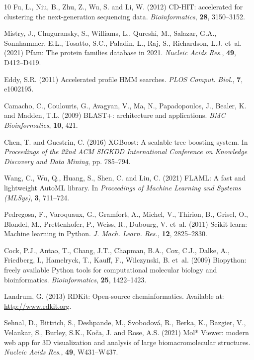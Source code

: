 \documentclass[unnumsec,webpdf,contemporary,large]{oup-authoring-template}%
\begin{document}
\begin{thebibliography}{10}
Fu, L., Niu, B., Zhu, Z., Wu, S. and Li, W. (2012)
CD-HIT: accelerated for clustering the next-generation sequencing data.
\newblock \emph{Bioinformatics}, \textbf{28}, 3150--3152.

Mistry, J., Chuguransky, S., Williams, L., Qureshi, M., Salazar, G.A., Sonnhammer, E.L., Tosatto, S.C., Paladin, L., Raj, S., Richardson, L.J. et~al. (2021)
Pfam: The protein families database in 2021.
\newblock \emph{Nucleic Acids Res.}, \textbf{49}, D412--D419.

Eddy, S.R. (2011)
Accelerated profile HMM searches.
\newblock \emph{PLOS Comput. Biol.}, \textbf{7}, e1002195.

Camacho, C., Coulouris, G., Avagyan, V., Ma, N., Papadopoulos, J., Bealer, K. and Madden, T.L. (2009)
BLAST+: architecture and applications.
\newblock \emph{BMC Bioinformatics}, \textbf{10}, 421.

Chen, T. and Guestrin, C. (2016)
XGBoost: A scalable tree boosting system.
\newblock In \emph{Proceedings of the 22nd ACM SIGKDD International Conference on Knowledge Discovery and Data Mining}, pp. 785--794.

Wang, C., Wu, Q., Huang, S., Shen, C. and Liu, C. (2021)
FLAML: A fast and lightweight AutoML library.
\newblock In \emph{Proceedings of Machine Learning and Systems (MLSys)}, \textbf{3}, 711--724.

Pedregosa, F., Varoquaux, G., Gramfort, A., Michel, V., Thirion, B., Grisel, O., Blondel, M., Prettenhofer, P., Weiss, R., Dubourg, V. et~al. (2011)
Scikit-learn: Machine learning in Python.
\newblock \emph{J. Mach. Learn. Res.}, \textbf{12}, 2825--2830.

Cock, P.J., Antao, T., Chang, J.T., Chapman, B.A., Cox, C.J., Dalke, A., Friedberg, I., Hamelryck, T., Kauff, F., Wilczynski, B. et~al. (2009)
Biopython: freely available Python tools for computational molecular biology and bioinformatics.
\newblock \emph{Bioinformatics}, \textbf{25}, 1422--1423.

Landrum, G. (2013)
RDKit: Open-source cheminformatics.
\newblock Available at: \url{http://www.rdkit.org}.

Sehnal, D., Bittrich, S., Deshpande, M., Svobodov{\'a}, R., Berka, K., Bazgier, V., Velankar, S., Burley, S.K., Ko{\v{c}}a, J. and Rose, A.S. (2021)
Mol* Viewer: modern web app for 3D visualization and analysis of large biomacromolecular structures.
\newblock \emph{Nucleic Acids Res.}, \textbf{49}, W431--W437.


\end{thebibliography}
\end{document}
